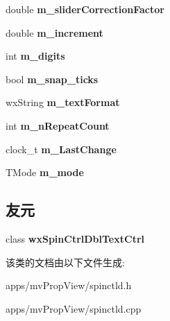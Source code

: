 \begin{DoxyCompactItemize}
\item 
\hypertarget{classwx_spin_ctrl_dbl_a103398152902ed22c40741d03671fc28}{double {\bfseries m\+\_\+slider\+Correction\+Factor}}\label{classwx_spin_ctrl_dbl_a103398152902ed22c40741d03671fc28}

\item 
\hypertarget{classwx_spin_ctrl_dbl_a1078ea9ce1aaeb275d4992e22543cb38}{double {\bfseries m\+\_\+increment}}\label{classwx_spin_ctrl_dbl_a1078ea9ce1aaeb275d4992e22543cb38}

\item 
\hypertarget{classwx_spin_ctrl_dbl_a2c52f374a2b5503e782501c289ddbd97}{int {\bfseries m\+\_\+digits}}\label{classwx_spin_ctrl_dbl_a2c52f374a2b5503e782501c289ddbd97}

\item 
\hypertarget{classwx_spin_ctrl_dbl_a243979a1ce517261fe05097cc51ef6f1}{bool {\bfseries m\+\_\+snap\+\_\+ticks}}\label{classwx_spin_ctrl_dbl_a243979a1ce517261fe05097cc51ef6f1}

\item 
\hypertarget{classwx_spin_ctrl_dbl_a35c136ec232ef9725cf41cde37e446b1}{wx\+String {\bfseries m\+\_\+text\+Format}}\label{classwx_spin_ctrl_dbl_a35c136ec232ef9725cf41cde37e446b1}

\item 
\hypertarget{classwx_spin_ctrl_dbl_ae3f03d6796bd253813decb3c9de63130}{int {\bfseries m\+\_\+n\+Repeat\+Count}}\label{classwx_spin_ctrl_dbl_ae3f03d6796bd253813decb3c9de63130}

\item 
\hypertarget{classwx_spin_ctrl_dbl_a54188c958b7cef17eaf5d228f24a5c82}{clock\+\_\+t {\bfseries m\+\_\+\+Last\+Change}}\label{classwx_spin_ctrl_dbl_a54188c958b7cef17eaf5d228f24a5c82}

\item 
\hypertarget{classwx_spin_ctrl_dbl_af927c8527363cbd78101df374c2721ad}{T\+Mode {\bfseries m\+\_\+mode}}\label{classwx_spin_ctrl_dbl_af927c8527363cbd78101df374c2721ad}

\end{DoxyCompactItemize}
\subsection*{友元}
\begin{DoxyCompactItemize}
\item 
\hypertarget{classwx_spin_ctrl_dbl_aa0b53e1865aea501836b7ac5594d9011}{class {\bfseries wx\+Spin\+Ctrl\+Dbl\+Text\+Ctrl}}\label{classwx_spin_ctrl_dbl_aa0b53e1865aea501836b7ac5594d9011}

\end{DoxyCompactItemize}


该类的文档由以下文件生成\+:\begin{DoxyCompactItemize}
\item 
apps/mv\+Prop\+View/spinctld.\+h\item 
apps/mv\+Prop\+View/spinctld.\+cpp\end{DoxyCompactItemize}
